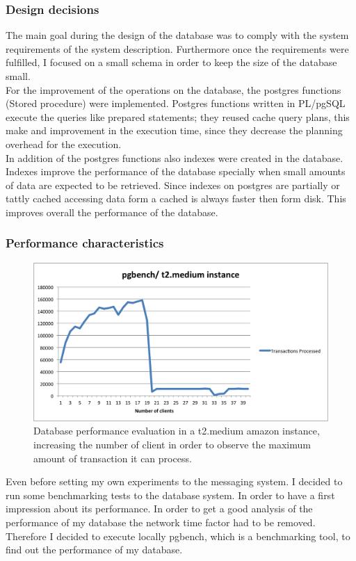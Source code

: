 \subsubsection{Design decisions}\label{sec:design-decisions}
The main goal during the design of the database was to comply with the system requirements of the system description. Furthermore once the requirements were fulfilled, I focused on a small schema in order to keep the size of the database small.\\
For the improvement of the operations on the database, the postgres functions (Stored procedure) were implemented.  Postgres functions written in PL/pgSQL execute the queries like prepared statements; they reused cache query plans, this make and improvement in the execution time, since they decrease the planning overhead for the execution.\cite{postsql}\\

In addition of the postgres functions also indexes were created in the database. Indexes improve the performance of the database specially when small amounts of data are expected to be retrieved. Since indexes on postgres are partially or tattly cached accessing data form a cached is always faster then form disk. This improves overall the performance of the database. 


\subsubsection{Performance characteristics}\label{sec:performance-characteristics}
\begin{figure}[h!]
	\centering
	\includegraphics[scale=0.5]{pgbench.png}
	\caption{Database performance evaluation in a t2.medium amazon instance, increasing the number of client in order to observe the maximum amount of transaction it can process.}
	\label{pgbench}
\end{figure}
Even before setting my own experiments to the messaging system. I decided to run some benchmarking tests to the database system. In order to have a first impression about its performance. In order to get a good analysis of the performance of my database the network time factor had to be removed. Therefore I decided to execute locally pgbench, which is a benchmarking tool, to find out the performance of my database.\\

